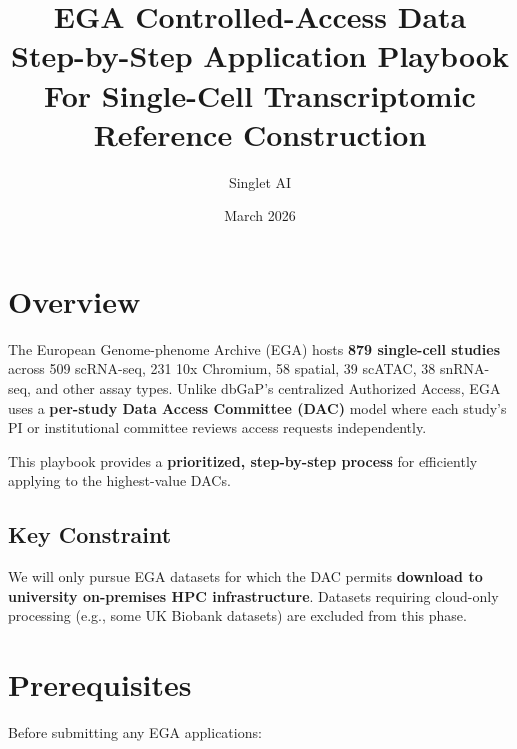 \documentclass[11pt,letterpaper]{article}
\title{%
    \vspace{-1.5cm}
    \textbf{EGA Controlled-Access Data}\\[0.3em]
    \large Step-by-Step Application Playbook\\[0.3em]
    \normalsize For Single-Cell Transcriptomic Reference Construction
}
\author{Singlet AI}
\date{March 2026}
\begin{document}
\maketitle
\thispagestyle{fancy}

\section{Overview}

The European Genome-phenome Archive (EGA) hosts \textbf{879 single-cell
studies} across 509 scRNA-seq, 231 10x Chromium, 58 spatial, 39 scATAC,
38 snRNA-seq, and other assay types. Unlike dbGaP's centralized
Authorized Access, EGA uses a \textbf{per-study Data Access Committee
(DAC)} model where each study's PI or institutional committee reviews
access requests independently.

This playbook provides a \textbf{prioritized, step-by-step process}
for efficiently applying to the highest-value DACs.

\subsection{Key Constraint}

We will only pursue EGA datasets for which the DAC permits
\textbf{download to university on-premises HPC infrastructure}.
Datasets requiring cloud-only processing (e.g., some UK Biobank
datasets) are excluded from this phase.

\section{Prerequisites}

Before submitting any EGA applications:
\end{document}

